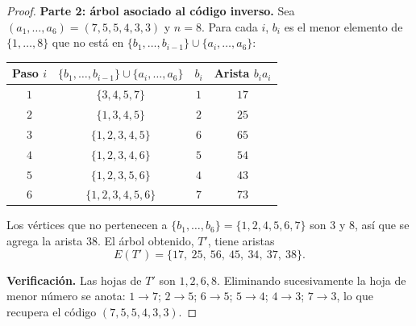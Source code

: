 \begin{proof}
    \textbf{Parte 2: árbol asociado al código inverso.} Sea \( (a_1, \ldots, a_6) = (7,5,5,4,3,3) \) y \( n = 8 \). Para cada \( i \), \( b_i \) es el menor elemento de \( \{1,\ldots,8\} \) que no está en \( \{b_1,\ldots,b_{i-1}\} \cup \{a_i,\ldots,a_6\} \):
    \begin{center}
        \begin{tabular}{cccc}
            \toprule
            Paso \( i \) & \( \{b_1,\ldots,b_{i-1}\} \cup \{a_i,\ldots,a_6\} \) & \( b_i \) & Arista \( b_i a_i \) \\
            \midrule
            \( 1 \)      & \( \{3,4,5,7\} \)                                    & \( 1 \)   & \( 17 \)             \\
            \( 2 \)      & \( \{1,3,4,5\} \)                                    & \( 2 \)   & \( 25 \)             \\
            \( 3 \)      & \( \{1,2,3,4,5\} \)                                  & \( 6 \)   & \( 65 \)             \\
            \( 4 \)      & \( \{1,2,3,4,6\} \)                                  & \( 5 \)   & \( 54 \)             \\
            \( 5 \)      & \( \{1,2,3,5,6\} \)                                  & \( 4 \)   & \( 43 \)             \\
            \( 6 \)      & \( \{1,2,3,4,5,6\} \)                                & \( 7 \)   & \( 73 \)             \\
            \bottomrule
        \end{tabular}
    \end{center}
    Los vértices que no pertenecen a \( \{b_1, \ldots, b_6\} = \{1,2,4,5,6,7\} \) son \( 3 \) y \( 8 \), así que se agrega la arista \( 38 \). El árbol obtenido, \( T' \), tiene aristas
    \[
        E(T') = \{17,\ 25,\ 56,\ 45,\ 34,\ 37,\ 38\}.
    \]
    \begin{center}
    \end{center}
    \textbf{Verificación.} Las hojas de \( T' \) son \( 1,2,6,8 \). Eliminando sucesivamente la hoja de menor número se anota: \( 1 \to 7 \); \( 2 \to 5 \); \( 6 \to 5 \); \( 5 \to 4 \); \( 4 \to 3 \); \( 7 \to 3 \), lo que recupera el código \( (7,5,5,4,3,3) \).
\end{proof}

